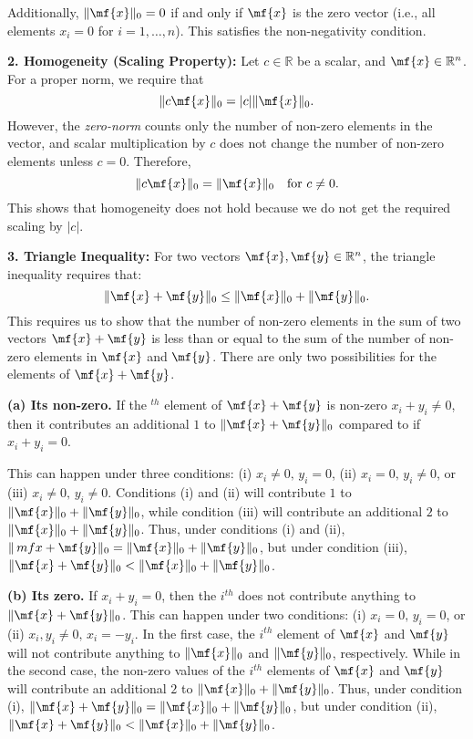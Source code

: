 \begin{enumerate}
\begin{boxedstuff}
        Additionally, $\Vert \mf{x} \Vert_0 = 0$ if and only if $\mf{x}$ is the zero vector (i.e., all elements $x_i = 0$ for $i = 1, \dots, n$). This satisfies the non-negativity condition.

        \textbf{2. Homogeneity (Scaling Property):} 
        Let $c \in \mathbb{R}$ be a scalar, and $\mf{x} \in \mathbb{R}^n$. For a proper norm, we require that 
        \[
        \Vert c \mf{x} \Vert_0 = |c| \Vert \mf{x} \Vert_0.
        \]
        However, the \textit{zero-norm} counts only the number of non-zero elements in the vector, and scalar multiplication by $c$ does not change the number of non-zero elements unless $c = 0$. Therefore,
        \[
        \Vert c \mf{x} \Vert_0 = \Vert \mf{x} \Vert_0 \quad \text{for } c \neq 0.
        \]
        This shows that homogeneity does not hold because we do not get the required scaling by $|c|$.

        \textbf{3. Triangle Inequality:} 
        For two vectors $\mf{x}, \mf{y} \in \mathbb{R}^n$, the triangle inequality requires that:
        \[
        \Vert \mf{x} + \mf{y} \Vert_0 \leq \Vert \mf{x} \Vert_0 + \Vert \mf{y} \Vert_0.
        \]
        This requires us to show that the number of non-zero elements in the sum of two vectors $\mf{x} + \mf{y}$ is less than or equal to the sum of the number of non-zero elements in $\mf{x}$ and $\mf{y}$. There are only two possibilities for the elements of $\mf{x} + \mf{y}$.
        
        \textbf{(a) Its non-zero.} If the $^{th}$ element of $\mf{x} + \mf{y}$ is non-zero $x_i + y_i \neq 0$, then it contributes an additional $1$ to $\Vert \mf{x} + \mf{y} \Vert_0$ compared to if $x_i + y_i = 0$. 
        
        This can happen under three conditions: (i) $x_i \neq 0, \, y_i = 0$, (ii) $x_i = 0, \, y_i \neq 0$, or (iii) $x_i \neq 0, \, y_i \neq 0$. Conditions (i) and (ii) will contribute $1$ to $\Vert \mf{x} \Vert_0 + \Vert \mf{y} \Vert_0$, while condition (iii) will contribute an additional $2$ to $\Vert \mf{x} \Vert_0 + \Vert \mf{y} \Vert_0$. Thus, under conditions (i) and (ii), $\Vert \,mf{x} + \mf{y} \Vert_0 = \Vert \mf{x} \Vert_0 + \Vert \mf{y} \Vert_0$, but under condition (iii), $\Vert \mf{x} + \mf{y} \Vert_0 < \Vert \mf{x} \Vert_0 + \Vert \mf{y} \Vert_0$.
        
        \textbf{(b) Its zero.} If $x_i + y_i = 0$, then the $i^{th}$ does not contribute anything to $\Vert \mf{x} + \mf{y} \Vert_0$. This can happen under two conditions: (i) $x_i = 0, \, y_i = 0$, or (ii) $x_i, y_i \neq 0, \, x_i = - y_i$. In the first case, the $i^{th}$ element of $\mf{x}$ and $\mf{y}$ will not contribute anything to $\Vert \mf{x} \Vert_0$ and $\Vert \mf{y} \Vert_0$, respectively. While in the second case, the non-zero values of the $i^{th}$ elements of $\mf{x}$ and $\mf{y}$ will contribute an additional $2$ to $\Vert \mf{x} \Vert_0 + \Vert \mf{y} \Vert_0$. Thus, under condition (i), $\Vert \mf{x} + \mf{y} \Vert_0 = \Vert \mf{x} \Vert_0 + \Vert \mf{y} \Vert_0$, but under condition (ii), $\Vert \mf{x} + \mf{y} \Vert_0 < \Vert \mf{x} \Vert_0 + \Vert \mf{y} \Vert_0$.


\end{boxedstuff}
\end{enumerate}
